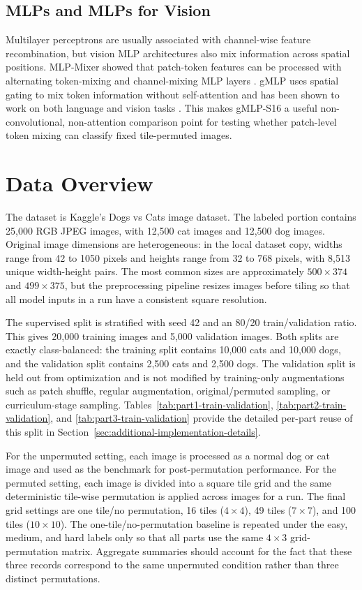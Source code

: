 \documentclass[12pt]{article}
\begin{document}
\subsection{MLPs and MLPs for Vision}

Multilayer perceptrons are usually associated with channel-wise feature recombination, but vision MLP architectures also mix information across spatial positions. MLP-Mixer showed that patch-token features can be processed with alternating token-mixing and channel-mixing MLP layers \citep{tolstikhin2021mlp}. gMLP uses spatial gating to mix token information without self-attention and has been shown to work on both language and vision tasks \citep{liu2021pay}. This makes gMLP-S16 a useful non-convolutional, non-attention comparison point for testing whether patch-level token mixing can classify fixed tile-permuted images.

\section{Data Overview}

The dataset is Kaggle's Dogs vs Cats image dataset. The labeled portion contains 25,000 RGB JPEG images, with 12,500 cat images and 12,500 dog images. Original image dimensions are heterogeneous: in the local dataset copy, widths range from 42 to 1050 pixels and heights range from 32 to 768 pixels, with 8,513 unique width-height pairs. The most common sizes are approximately $500 \times 374$ and $499 \times 375$, but the preprocessing pipeline resizes images before tiling so that all model inputs in a run have a consistent square resolution.

The supervised split is stratified with seed 42 and an 80/20 train/validation ratio. This gives 20,000 training images and 5,000 validation images. Both splits are exactly class-balanced: the training split contains 10,000 cats and 10,000 dogs, and the validation split contains 2,500 cats and 2,500 dogs. The validation split is held out from optimization and is not modified by training-only augmentations such as patch shuffle, regular augmentation, original/permuted sampling, or curriculum-stage sampling. Tables~\ref{tab:part1-train-validation}, \ref{tab:part2-train-validation}, and \ref{tab:part3-train-validation} provide the detailed per-part reuse of this split in Section~\ref{sec:additional-implementation-details}.

For the unpermuted setting, each image is processed as a normal dog or cat image and used as the benchmark for post-permutation performance. For the permuted setting, each image is divided into a square tile grid and the same deterministic tile-wise permutation is applied across images for a run. The final grid settings are one tile/no permutation, 16 tiles ($4 \times 4$), 49 tiles ($7 \times 7$), and 100 tiles ($10 \times 10$). The one-tile/no-permutation baseline is repeated under the easy, medium, and hard labels only so that all parts use the same $4 \times 3$ grid-permutation matrix. Aggregate summaries should account for the fact that these three records correspond to the same unpermuted condition rather than three distinct permutations.
\end{document}
